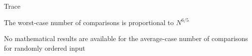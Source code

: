 \documentclass[8pt,a4paper,compress]{beamer}
\begin{document}
\begin{frame}[fragile]
\pause

Trace
\begin{center}
\end{center}
\end{frame}

\begin{frame}[fragile]
\pause

The worst-case number of comparisons is proportional to $N^{6/5}$

\pause
\bigskip

No mathematical results are available for the average-case number of comparisons for randomly ordered input
\end{frame}
\end{document}
